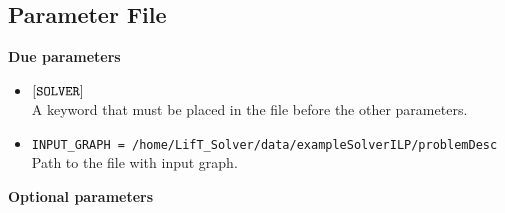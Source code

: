 \documentclass[a4paper,10pt]{article}
\begin{document}
\subsection{Parameter File}
\textbf{Due parameters}
\begin{itemize}
 \item  $[\text{\texttt{SOLVER}}]$\\
 A keyword that must be placed in the file before the other parameters.
 \item  \texttt{INPUT\_GRAPH = /home/LifT\_Solver/data/exampleSolverILP/problemDesc} \\
 Path to the file with input graph.
 

 

 \end{itemize}
 \textbf{Optional parameters}
\end{document}
